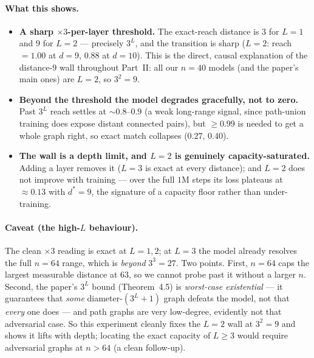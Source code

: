 \documentclass[11pt,a4paper]{article}
\begin{document}
\paragraph{What this shows.}
\begin{itemize}
    \item \textbf{A sharp $\times 3$-per-layer threshold.} The exact-reach
          distance is $3$ for $L = 1$ and $9$ for $L = 2$ --- precisely $3^L$, and
          the transition is sharp ($L = 2$: reach $= 1.00$ at $d = 9$, $0.88$ at
          $d = 10$). This is the direct, causal explanation of the distance-$9$
          wall throughout Part~II: all our $n = 40$ models (and the paper's main
          ones) are $L = 2$, so $3^2 = 9$.
    \item \textbf{Beyond the threshold the model degrades gracefully, not to
          zero.} Past $3^L$ reach settles at $\sim 0.8$--$0.9$ (a weak long-range
          signal, since path-union training does expose distant connected pairs),
          but $\ge 0.99$ is needed to get a whole graph right, so exact match
          collapses ($0.27$, $0.40$).
    \item \textbf{The wall is a depth limit, and $L = 2$ is genuinely
          capacity-saturated.} Adding a layer removes it ($L = 3$ is exact at
          every distance); and $L = 2$ does not improve with training --- over the
          full $1$M steps its loss plateaus at $\approx 0.13$ with $d^* = 9$,
          the signature of a capacity floor rather than under-training.
\end{itemize}

\paragraph{Caveat (the high-$L$ behaviour).} The clean $\times 3$ reading is exact
at $L = 1, 2$; at $L = 3$ the model already resolves the full $n = 64$ range,
which is \emph{beyond} $3^3 = 27$. Two points. First, $n = 64$ caps the largest
measurable distance at $63$, so we cannot probe past it without a larger $n$.
Second, the paper's $3^L$ bound (Theorem~4.5) is \emph{worst-case existential} ---
it guarantees that \emph{some} diameter-$(3^L{+}1)$ graph defeats the model, not
that \emph{every} one does --- and path graphs are very low-degree, evidently not
that adversarial case. So this experiment cleanly fixes the $L = 2$ wall at
$3^2 = 9$ and shows it lifts with depth; locating the exact capacity of $L \ge 3$
would require adversarial graphs at $n > 64$ (a clean follow-up).
\end{document}
